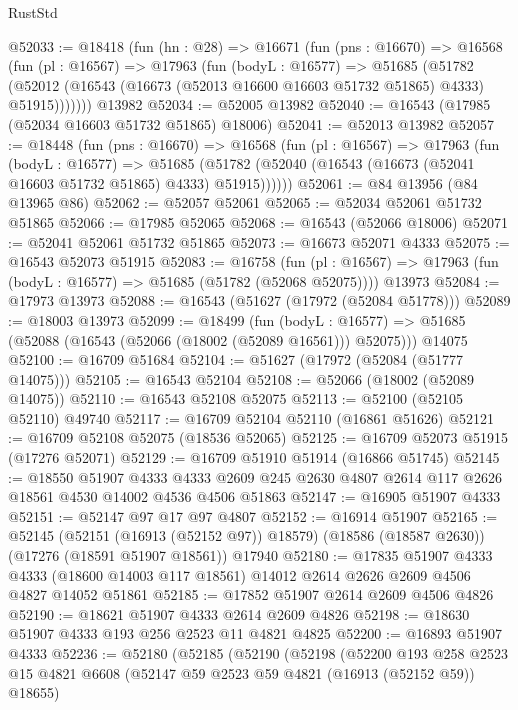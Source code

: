 \begin{lexlean}{RustStd}
\begin{coremodule}
@52033 := @18418
    (fun (hn : @28) =>
    @16671
      (fun (pns : @16670) =>
      @16568
        (fun (pl : @16567) =>
        @17963
          (fun (bodyL : @16577) =>
          @51685
            (@51782
              (@52012 (@16543 (@16673 (@52013 @16600 @16603 @51732 @51865) @4333) @51915)))))))
    @13982
@52034 := @52005 @13982
@52040 := @16543 (@17985 (@52034 @16603 @51732 @51865) @18006)
@52041 := @52013 @13982
@52057 := @18448
    (fun (pns : @16670) =>
    @16568
      (fun (pl : @16567) =>
      @17963
        (fun (bodyL : @16577) =>
        @51685 (@51782 (@52040 (@16543 (@16673 (@52041 @16603 @51732 @51865) @4333) @51915))))))
@52061 := @84 @13956 (@84 @13965 @86)
@52062 := @52057 @52061
@52065 := @52034 @52061 @51732 @51865
@52066 := @17985 @52065
@52068 := @16543 (@52066 @18006)
@52071 := @52041 @52061 @51732 @51865
@52073 := @16673 @52071 @4333
@52075 := @16543 @52073 @51915
@52083 := @16758
    (fun (pl : @16567) => @17963 (fun (bodyL : @16577) => @51685 (@51782 (@52068 @52075))))
    @13973
@52084 := @17973 @13973
@52088 := @16543 (@51627 (@17972 (@52084 @51778)))
@52089 := @18003 @13973
@52099 := @18499
    (fun (bodyL : @16577) => @51685 (@52088 (@16543 (@52066 (@18002 (@52089 @16561))) @52075)))
    @14075
@52100 := @16709 @51684
@52104 := @51627 (@17972 (@52084 (@51777 @14075)))
@52105 := @16543 @52104
@52108 := @52066 (@18002 (@52089 @14075))
@52110 := @16543 @52108 @52075
@52113 := @52100 (@52105 @52110) @49740
@52117 := @16709 @52104 @52110 (@16861 @51626)
@52121 := @16709 @52108 @52075 (@18536 @52065)
@52125 := @16709 @52073 @51915 (@17276 @52071)
@52129 := @16709 @51910 @51914 (@16866 @51745)
@52145 := @18550
    @51907
    @4333
    @4333
    @2609
    @245
    @2630
    @4807
    @2614
    @117
    @2626
    @18561
    @4530
    @14002
    @4536
    @4506
    @51863
@52147 := @16905 @51907 @4333
@52151 := @52147 @97 @17 @97 @4807
@52152 := @16914 @51907
@52165 := @52145
    (@52151 (@16913 (@52152 @97)) @18579)
    (@18586 (@18587 @2630))
    (@17276 (@18591 @51907 @18561))
    @17940
@52180 := @17835
    @51907
    @4333
    @4333
    (@18600 @14003 @117 @18561)
    @14012
    @2614
    @2626
    @2609
    @4506
    @4827
    @14052
    @51861
@52185 := @17852 @51907 @2614 @2609 @4506 @4826
@52190 := @18621 @51907 @4333 @2614 @2609 @4826
@52198 := @18630 @51907 @4333 @193 @256 @2523 @11 @4821 @4825
@52200 := @16893 @51907 @4333
@52236 := @52180
    (@52185
      (@52190
        (@52198
          (@52200
            @193
            @258
            @2523
            @15
            @4821
            @6608
            (@52147 @59 @2523 @59 @4821 (@16913 (@52152 @59)) @18655)

\end{coremodule}
\end{lexlean}
